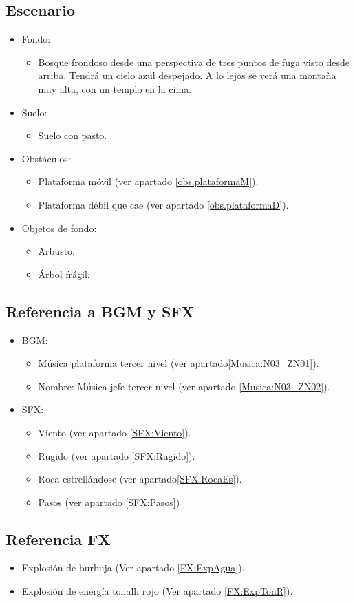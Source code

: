 \subsection{Escenario}
\begin{itemize} 
	\item Fondo:
\begin{itemize}
	\item Bosque frondoso desde una perspectiva de tres puntos de fuga visto desde arriba. Tendrá un cielo azul despejado. A lo lejos se verá una montaña muy alta, con un templo en la cima.
\end{itemize}
	\item Suelo:
		\begin{itemize}
			\item Suelo con pasto.
		\end{itemize}
	\item Obstáculos:
		\begin{itemize}
			\item Plataforma móvil (ver apartado \ref{obs.plataformaM}).
			\item Plataforma débil que cae (ver apartado \ref{obs.plataformaD}).
		\end{itemize}
	\item Objetos de fondo:
		\begin{itemize}
			\item Arbusto.
			\item Árbol frágil.
		\end{itemize}
\end{itemize}	
	\subsection{Referencia a BGM y SFX}
\begin{itemize}
	\item BGM:
		\begin{itemize}
			\item Música plataforma tercer nivel (ver apartado\ref{Musica:N03_ZN01}).
			\item Nombre: Música jefe tercer nivel (ver apartado \ref{Musica:N03_ZN02}).
		\end{itemize}
	\item SFX:
		\begin{itemize}
			\item Viento (ver apartado \ref{SFX:Viento}).
			\item Rugido (ver apartado \ref{SFX:Rugido}).
			\item Roca estrellándose (ver apartado\ref{SFX:RocaEs}).
			\item Pasos (ver apartado \ref{SFX:Pasos})
		\end{itemize}
\end{itemize} 
	\subsection{Referencia FX}
\begin{itemize}
	\item Explosión de burbuja (Ver apartado \ref{FX:ExpAgua}).
	\item Explosión de energía tonalli rojo (Ver apartado \ref{FX:ExpTonR}).
\end{itemize}